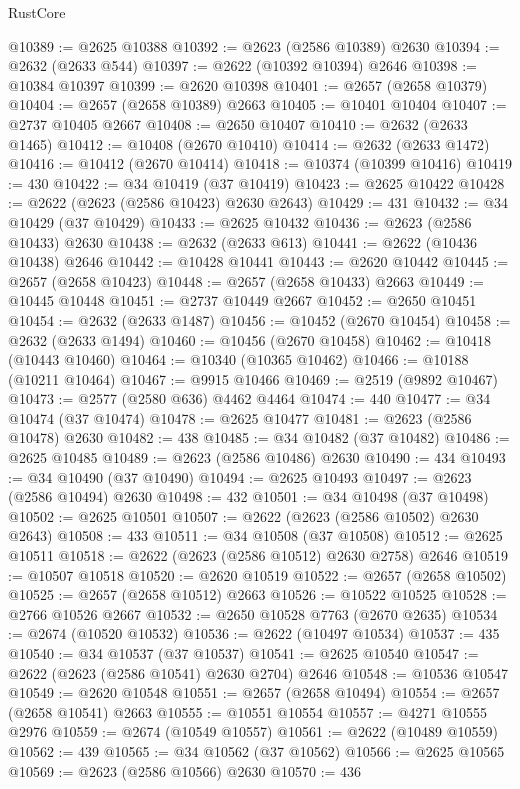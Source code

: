 \begin{lexlean}{RustCore}
\begin{coremodule}
@10389 := @2625 @10388
@10392 := @2623 (@2586 @10389) @2630
@10394 := @2632 (@2633 @544)
@10397 := @2622 (@10392 @10394) @2646
@10398 := @10384 @10397
@10399 := @2620 @10398
@10401 := @2657 (@2658 @10379)
@10404 := @2657 (@2658 @10389) @2663
@10405 := @10401 @10404
@10407 := @2737 @10405 @2667
@10408 := @2650 @10407
@10410 := @2632 (@2633 @1465)
@10412 := @10408 (@2670 @10410)
@10414 := @2632 (@2633 @1472)
@10416 := @10412 (@2670 @10414)
@10418 := @10374 (@10399 @10416)
@10419 := 430
@10422 := @34 @10419 (@37 @10419)
@10423 := @2625 @10422
@10428 := @2622 (@2623 (@2586 @10423) @2630 @2643)
@10429 := 431
@10432 := @34 @10429 (@37 @10429)
@10433 := @2625 @10432
@10436 := @2623 (@2586 @10433) @2630
@10438 := @2632 (@2633 @613)
@10441 := @2622 (@10436 @10438) @2646
@10442 := @10428 @10441
@10443 := @2620 @10442
@10445 := @2657 (@2658 @10423)
@10448 := @2657 (@2658 @10433) @2663
@10449 := @10445 @10448
@10451 := @2737 @10449 @2667
@10452 := @2650 @10451
@10454 := @2632 (@2633 @1487)
@10456 := @10452 (@2670 @10454)
@10458 := @2632 (@2633 @1494)
@10460 := @10456 (@2670 @10458)
@10462 := @10418 (@10443 @10460)
@10464 := @10340 (@10365 @10462)
@10466 := @10188 (@10211 @10464)
@10467 := @9915 @10466
@10469 := @2519 (@9892 @10467)
@10473 := @2577 (@2580 @636) @4462 @4464
@10474 := 440
@10477 := @34 @10474 (@37 @10474)
@10478 := @2625 @10477
@10481 := @2623 (@2586 @10478) @2630
@10482 := 438
@10485 := @34 @10482 (@37 @10482)
@10486 := @2625 @10485
@10489 := @2623 (@2586 @10486) @2630
@10490 := 434
@10493 := @34 @10490 (@37 @10490)
@10494 := @2625 @10493
@10497 := @2623 (@2586 @10494) @2630
@10498 := 432
@10501 := @34 @10498 (@37 @10498)
@10502 := @2625 @10501
@10507 := @2622 (@2623 (@2586 @10502) @2630 @2643)
@10508 := 433
@10511 := @34 @10508 (@37 @10508)
@10512 := @2625 @10511
@10518 := @2622 (@2623 (@2586 @10512) @2630 @2758) @2646
@10519 := @10507 @10518
@10520 := @2620 @10519
@10522 := @2657 (@2658 @10502)
@10525 := @2657 (@2658 @10512) @2663
@10526 := @10522 @10525
@10528 := @2766 @10526 @2667
@10532 := @2650 @10528 @7763 (@2670 @2635)
@10534 := @2674 (@10520 @10532)
@10536 := @2622 (@10497 @10534)
@10537 := 435
@10540 := @34 @10537 (@37 @10537)
@10541 := @2625 @10540
@10547 := @2622 (@2623 (@2586 @10541) @2630 @2704) @2646
@10548 := @10536 @10547
@10549 := @2620 @10548
@10551 := @2657 (@2658 @10494)
@10554 := @2657 (@2658 @10541) @2663
@10555 := @10551 @10554
@10557 := @4271 @10555 @2976
@10559 := @2674 (@10549 @10557)
@10561 := @2622 (@10489 @10559)
@10562 := 439
@10565 := @34 @10562 (@37 @10562)
@10566 := @2625 @10565
@10569 := @2623 (@2586 @10566) @2630
@10570 := 436

\end{coremodule}
\end{lexlean}
